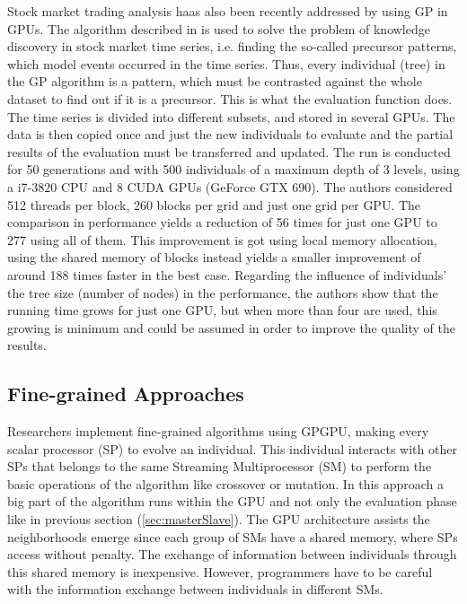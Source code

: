 \documentclass[Afour,sageh,times]{sagej}
\begin{document}
Stock market trading analysis haas also been recently addressed by using GP in GPUs. The algorithm described in \citep{Sungjoo15fastknowledge} is used to solve the problem of knowledge discovery in stock market time series, i.e. finding the so-called precursor patterns, which model events occurred in the time series. Thus, every individual (tree) in the GP algorithm is a pattern, which must be contrasted against the whole dataset to find out if it is a precursor. This is what the evaluation function does. The time series is divided into different subsets, and stored in several GPUs. The data is then copied once and just the new individuals to evaluate and the partial results of the evaluation must be transferred and updated. The run is conducted for 50 generations and with 500 individuals of a maximum depth of 3 levels, using a i7-3820 CPU and 8 CUDA GPUs (GeForce GTX 690). The authors considered 512 threads per block, 260 blocks per grid and just one grid per GPU. The comparison in performance yields a reduction of 56 times for just one GPU to 277 using all of them. This improvement is got using local memory allocation, using the shared memory of blocks instead yields a smaller improvement of around 188 times faster in the best case. Regarding the influence of individuals’ the tree size (number of nodes) in the performance, the authors show that the running time grows for just one GPU, but when more than four are used, this growing is minimum and could be assumed in order to improve the quality of the results.

\subsection{Fine-grained Approaches}



Researchers implement fine-grained algorithms using GPGPU, making every scalar processor (SP) to evolve an individual. This individual interacts with other SPs that belongs to the same Streaming Multiprocessor (SM) to perform the basic operations of the algorithm like crossover or mutation. In this approach a big part of the algorithm runs within the GPU and not only the evaluation phase like in previous section (\ref{sec:masterSlave}). The GPU architecture assists the neighborhoods emerge since each group of SMs have a shared memory, where SPs access without penalty. The exchange of information between individuals through this shared memory is inexpensive. However, programmers have to be careful with the information exchange between individuals in different SMs. 
\end{document}
